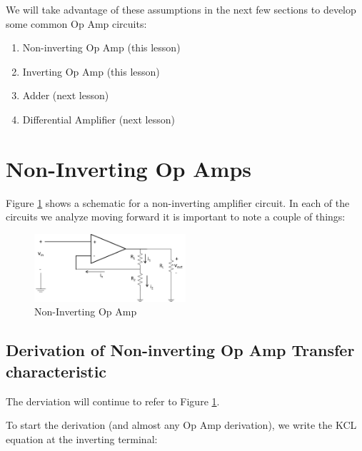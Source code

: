 \documentclass{handout}
\begin{document}
We will take advantage of these assumptions in the next few sections to develop some common Op Amp circuits:

\begin{enumerate}
	\item Non-inverting Op Amp (this lesson)
	\item Inverting Op Amp (this lesson)
	\item Adder (next lesson)
	\item Differential Amplifier (next lesson)
\end{enumerate}

\section{Non-Inverting Op Amps}
Figure \ref{fig: NonInvertingOpAmp} shows a schematic for a non-inverting amplifier circuit.  In each of the circuits we analyze moving forward it is important to note a couple of things:

\begin{figure}
\centering
\includegraphics[width=0.5\textwidth]{NonInvertingOpAmp.jpg}
\caption{Non-Inverting Op Amp}
\label{fig: NonInvertingOpAmp}
\end{figure}

\subsection{Derivation of Non-inverting Op Amp Transfer characteristic}
The derviation will continue to refer to Figure \ref{fig: NonInvertingOpAmp}.

To start the derivation (and almost any Op Amp derivation), we write the KCL equation at the inverting terminal:
\end{document}

